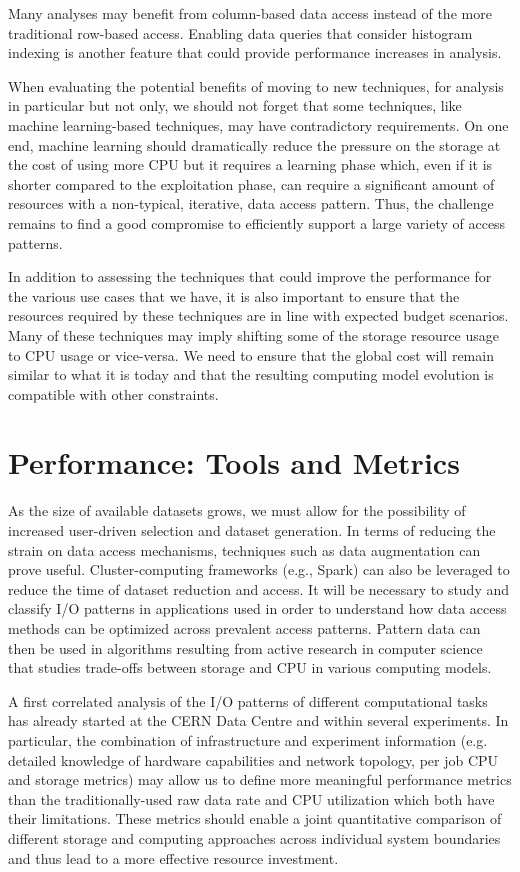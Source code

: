 \documentclass[12pt,a4paper]{article}
\begin{document}
Many analyses may benefit from column-based data access instead of the
more traditional row-based access. Enabling data queries that consider
histogram indexing is another feature that could provide performance
increases in analysis.

When evaluating the potential benefits of moving to new techniques, for
analysis in particular but not only, we should not forget that some
techniques, like machine learning-based techniques, may have
contradictory requirements. On one end, machine learning should
dramatically reduce the pressure on the storage at the cost of using
more CPU but it requires a learning phase which, even if it is shorter
compared to the exploitation phase, can require a significant amount of
resources with a non-typical, iterative, data access pattern. Thus, the
challenge remains to find a good compromise to efficiently support a
large variety of access patterns.

In addition to assessing the techniques that could improve the
performance for the various use cases that we have, it is also important
to ensure that the resources required by these techniques are in line
with expected budget scenarios. Many of these techniques may imply
shifting some of the storage resource usage to CPU usage or vice-versa.
We need to ensure that the global cost will remain similar to what it is
today and that the resulting computing model evolution is compatible
with other constraints.

\section{Performance: Tools and
Metrics}\label{performance-tools-and-metrics}

As the size of available datasets grows, we must allow for the
possibility of increased user-driven selection and dataset generation.
In terms of reducing the strain on data access mechanisms, techniques such as data
augmentation can prove useful. Cluster-computing frameworks (e.g.,
Spark) can also be leveraged to reduce the time of dataset reduction and
access. It will be necessary to study and classify I/O patterns in
applications used in order to understand how data access methods can be
optimized across prevalent access patterns. Pattern data can then be
used in algorithms resulting from active research in computer science
that studies trade-offs between storage and CPU in various computing models.

A first correlated analysis of the I/O patterns of different
computational tasks has already started at the CERN Data Centre and
within several experiments. In particular, the combination of
infrastructure and experiment information (e.g. detailed knowledge of
hardware capabilities and network topology, per job CPU and storage
metrics) may allow us to define more meaningful performance metrics than
the traditionally-used raw data rate and CPU utilization which both have
their limitations. These metrics should enable a joint quantitative
comparison of different storage and computing approaches across
individual system boundaries and thus lead to a more effective resource
investment.
\end{document}
